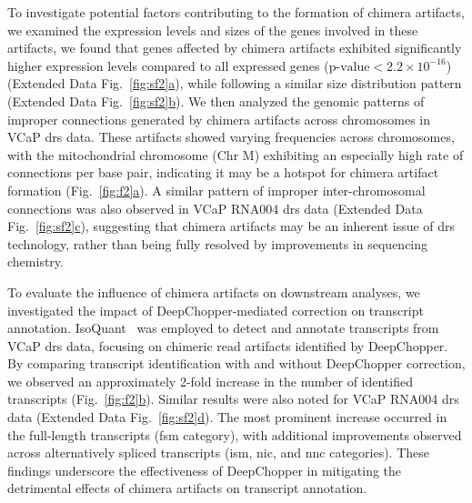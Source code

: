 \documentclass[pdflatex,sn-nature, lineno]{sn-jnl}%
\newcommand{\figref}[2]{Fig.~\hyperref[#1]{\ref*{#1}#2}}
\newcommand{\edfigref}[2]{Extended Data Fig.~\hyperref[#1]{\ref*{#1}#2}}
\begin{document}

To investigate potential factors contributing to the formation of chimera artifacts, we examined the expression levels and sizes of the genes involved in these artifacts, we found that genes affected by chimera artifacts exhibited significantly higher expression levels compared to all expressed genes (\(\textrm{p-value} < 2.2 \times 10^{-16}\)) (\edfigref{fig:sf2}{a}), while following a similar size distribution pattern (\edfigref{fig:sf2}{b}).
We then analyzed the genomic patterns of improper connections generated by chimera artifacts across chromosomes in VCaP \gls{drs} data.
These artifacts showed varying frequencies across chromosomes, with the mitochondrial chromosome (Chr M) exhibiting an especially high rate of connections per base pair, indicating it may be a hotspot for chimera artifact formation (\figref{fig:f2}{a}).
A similar pattern of improper inter-chromosomal connections was also observed in VCaP RNA004 \gls{drs} data (\edfigref{fig:sf2}{c}), suggesting that chimera artifacts may be an inherent issue of \gls{drs} technology, rather than being fully resolved by improvements in sequencing chemistry.

To evaluate the influence of chimera artifacts on downstream analyses, we investigated the impact of DeepChopper-mediated correction on transcript annotation.
IsoQuant~\cite{prjibelski2023accurate} was employed to detect and annotate transcripts from VCaP \gls{drs} data, focusing on chimeric read artifacts identified by DeepChopper.
By comparing transcript identification with and without DeepChopper correction, we observed an approximately 2-fold increase in the number of identified transcripts (\figref{fig:f2}{b}).
Similar results were also noted for VCaP RNA004 \gls{drs} data (\edfigref{fig:sf2}{d}).
The most prominent increase occurred in the full-length transcripts (\gls{fsm} category), with additional improvements observed across alternatively spliced transcripts (\gls{ism}, \gls{nic}, and \gls{nnc} categories).
These findings underscore the effectiveness of DeepChopper in mitigating the detrimental effects of chimera artifacts on transcript annotation.
\end{document}
